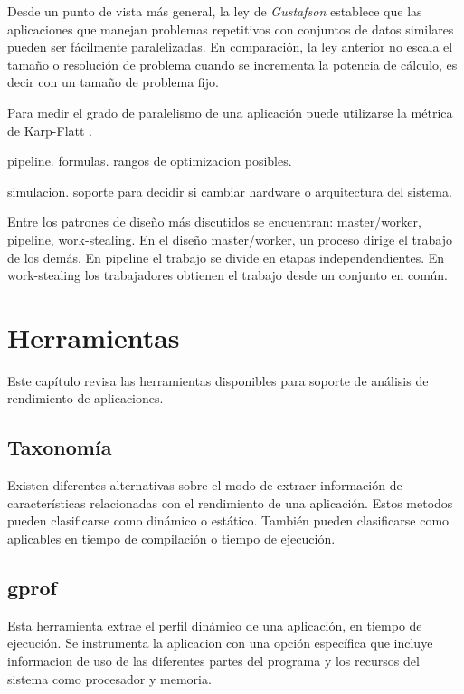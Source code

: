 \documentclass[a4paper]{report}
\begin{document}
\bigskip

Desde un punto de vista m\'as general, la ley de {\it Gustafson}
\cite{gustafson} establece que las aplicaciones que manejan problemas
repetitivos con conjuntos de datos similares pueden ser f\'acilmente
paralelizadas. En comparaci\'on, la ley anterior no escala el tama\~no o
resoluci\'on de problema cuando se incrementa la potencia de c\'alculo, es
decir con un tama\~no de problema fijo.

\bigskip

Para medir el grado de paralelismo de una aplicaci\'on puede utilizarse la
m\'etrica de Karp-Flatt \cite{karp-flatt}.

pipeline. formulas. rangos de optimizacion posibles.

simulacion. soporte para decidir si cambiar hardware o arquitectura del
sistema.

\bigskip

Entre los patrones de dise\~no m\'as discutidos se encuentran: master/worker,
pipeline, work-stealing. En el dise\~no master/worker, un proceso dirige el
trabajo de los dem\'as. En pipeline el trabajo se divide en etapas
independendientes. En work-stealing los trabajadores obtienen el trabajo desde
un conjunto en com\'un.

\chapter{Herramientas}

Este cap\'itulo revisa las herramientas disponibles para soporte de an\'alisis
de rendimiento de aplicaciones.

\section{Taxonom\'ia}

Existen diferentes alternativas sobre el modo de extraer informaci\'on de
caracter\'isticas relacionadas con el rendimiento de una aplicaci\'on.
Estos metodos pueden clasificarse como din\'amico o est\'atico.
Tambi\'en pueden clasificarse como aplicables en tiempo de compilaci\'on o
tiempo de ejecuci\'on.

\section{gprof}

Esta herramienta extrae el perfil din\'amico de una aplicaci\'on, en tiempo
de ejecuci\'on. Se instrumenta la aplicacion con una opci\'on espec\'ifica que
incluye informacion de uso de las diferentes partes del programa y los
recursos del sistema como procesador y memoria.
\end{document}
